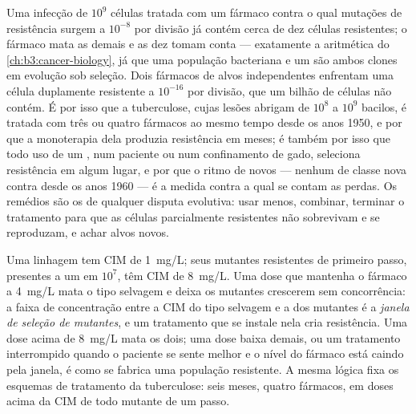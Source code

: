 \begin{proposition}\label{prop:b3:bacteriology:selection}
Uma infecção de $10^{9}$ células tratada com um fármaco contra o qual
mutações de resistência surgem a $10^{-8}$ por divisão já contém cerca
de dez células resistentes; o fármaco mata as demais e as dez tomam
conta --- exatamente a aritmética do \cref{ch:b3:cancer-biology}, já
que uma população bacteriana e um  são ambos clones em evolução
sob seleção. Dois fármacos de alvos independentes enfrentam uma célula
duplamente resistente a $10^{-16}$ por divisão, que um bilhão de
células não contém. É por isso que a tuberculose, cujas lesões abrigam
de $10^{8}$ a $10^{9}$ bacilos, é tratada com três ou quatro fármacos
ao mesmo tempo desde os anos 1950, e por que a monoterapia dela
produzia resistência em meses; é também por isso que todo uso de um
, num paciente ou num confinamento de gado, seleciona
resistência em algum lugar, e por que o ritmo de  novos ---
nenhum de classe nova contra  desde os anos 1960 --- é a
medida contra a qual se contam as perdas. Os remédios são os de
qualquer disputa evolutiva: usar menos, combinar, terminar o
tratamento para que as células parcialmente resistentes não sobrevivam
e se reproduzam, e achar alvos novos.
\end{proposition}

\begin{example}\label{ex:b3:bacteriology:window}
Uma linhagem tem CIM de \qty{1}{mg/L}; seus mutantes resistentes de
primeiro passo, presentes a um em $10^{7}$, têm CIM de \qty{8}{mg/L}.
Uma dose que mantenha o fármaco a \qty{4}{mg/L} mata o tipo selvagem e
deixa os mutantes crescerem sem concorrência: a faixa de concentração
entre a CIM do tipo selvagem e a dos mutantes é a \emph{janela de
seleção de mutantes}, e um tratamento que se instale nela cria
resistência. Uma dose acima de \qty{8}{mg/L} mata os dois; uma dose
baixa demais, ou um tratamento interrompido quando o paciente se sente
melhor e o nível do fármaco está caindo pela janela, é como se fabrica
uma população resistente. A mesma lógica fixa os esquemas de tratamento
da tuberculose: seis meses, quatro fármacos, em doses acima da CIM de
todo mutante de um passo.
\end{example}

